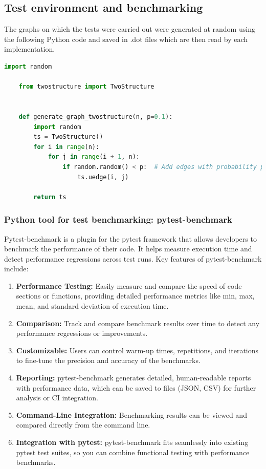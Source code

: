 \subsection{Test environment and benchmarking}\label{subsec:test-environment-and-benchmarking}

The graphs on which the tests were carried out were generated at random using the following Python code and saved in .dot files which are then read by each implementation.

\begin{lstlisting}[language=Python, style=python, caption={Graph generation code}, label={lst:graph-generation-code}, firstnumber=1]
    import random

    from twostructure import TwoStructure


    def generate_graph_twostructure(n, p=0.1):
        import random
        ts = TwoStructure()
        for i in range(n):
            for j in range(i + 1, n):
                if random.random() < p:  # Add edges with probability p
                    ts.uedge(i, j)

        return ts
\end{lstlisting}


\subsubsection{Python tool for test benchmarking: pytest-benchmark}

Pytest-benchmark\cite{pytestbenchmark} is a plugin for the pytest framework that allows developers to benchmark the performance of their code.
It helps measure execution time and detect performance regressions across test runs.
Key features of pytest-benchmark include:
\begin{enumerate}
    \item \textbf{Performance Testing:} Easily measure and compare the speed of code sections or functions, providing detailed performance metrics like min, max, mean, and standard deviation of execution time.
    \item \textbf{Comparison:} Track and compare benchmark results over time to detect any performance regressions or improvements.
    \item \textbf{Customizable:} Users can control warm-up times, repetitions, and iterations to fine-tune the precision and accuracy of the benchmarks.
    \item \textbf{Reporting:} pytest-benchmark generates detailed, human-readable reports with performance data, which can be saved to files (JSON, CSV) for further analysis or CI integration.
    \item \textbf{Command-Line Integration:} Benchmarking results can be viewed and compared directly from the command line.
    \item \textbf{Integration with pytest:} pytest-benchmark fits seamlessly into existing pytest test suites, so you can combine functional testing with performance benchmarks.
\end{enumerate}


